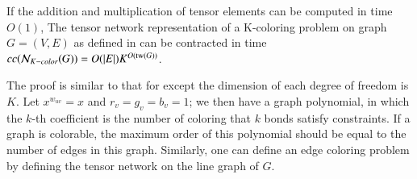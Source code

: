 \documentclass[review, onefignum, onetabnum]{siamart190516}
\begin{document}
\begin{theorem}\label{thm:cutcomplex}
    If the addition and multiplication of tensor elements can be computed in time $O(1)$,
    The tensor network representation of a K-coloring problem on graph $G=(V,E)$ as defined in  can be contracted in time $cc(\mathcal{N}_{K-color}(G)) = O(|E|)K^{O({\rm tw}(G))}$.
\end{theorem}
The proof is similar to that for  except the dimension of each degree of freedom is $K$.
Let $x^{w_{uv}} = x$ and $r_v = g_v = b_v = 1$; we then have a graph polynomial,
in which the $k$-th coefficient is the number of coloring that $k$ bonds satisfy constraints.
If a graph is colorable, the maximum order of this polynomial should be equal to the number of edges in this graph.
Similarly, one can define an edge coloring problem by defining the tensor network on the line graph of $G$.
\end{document}
